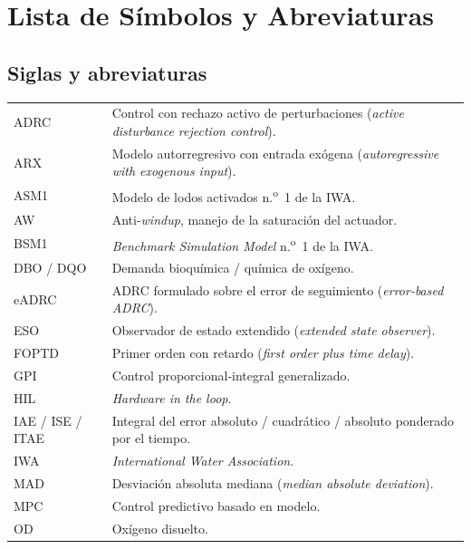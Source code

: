 \chapter*{Lista de Símbolos y Abreviaturas}

\section*{Siglas y abreviaturas}

\begin{longtable}{p{2.6cm}p{12.5cm}}
ADRC & Control con rechazo activo de perturbaciones (\textit{active disturbance rejection control}). \\
ARX & Modelo autorregresivo con entrada exógena (\textit{autoregressive with exogenous input}). \\
ASM1 & Modelo de lodos activados n.\textsuperscript{o}~1 de la IWA. \\
AW & Anti-\emph{windup}, manejo de la saturación del actuador. \\
BSM1 & \textit{Benchmark Simulation Model} n.\textsuperscript{o}~1 de la IWA. \\
DBO / DQO & Demanda bioquímica / química de oxígeno. \\
eADRC & ADRC formulado sobre el error de seguimiento (\textit{error-based ADRC}). \\
ESO & Observador de estado extendido (\textit{extended state observer}). \\
FOPTD & Primer orden con retardo (\textit{first order plus time delay}). \\
GPI & Control proporcional-integral generalizado. \\
HIL & \textit{Hardware in the loop}. \\
IAE / ISE / ITAE & Integral del error absoluto / cuadrático / absoluto ponderado por el tiempo. \\
IWA & \textit{International Water Association}. \\
MAD & Desviación absoluta mediana (\textit{median absolute deviation}). \\
MPC & Control predictivo basado en modelo. \\
OD & Oxígeno disuelto. \\

\end{longtable}
